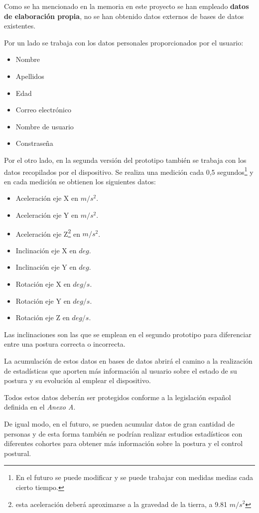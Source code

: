 
Como se ha mencionado en la memoria en este proyecto se han empleado \textbf{datos de elaboración propia}, no se han obtenido datos externos de bases de datos existentes. 

Por un lado se trabaja con los datos personales proporcionados por el usuario:
\begin{itemize}
    \item Nombre
    \item Apellidos
    \item Edad
    \item Correo electrónico
    \item Nombre de usuario
    \item Constraseña
\end{itemize}

Por el otro lado, en la segunda versión del prototipo también se trabaja con los datos recopilados por el dispositivo. Se realiza una medición cada 0,5 segundos\footnote{En el futuro se puede modificar y se puede trabajar con medidas medias cada cierto tiempo.} y en cada medición se obtienen los siguientes datos:
\begin{itemize}
    \item Aceleración eje X en $m/s^{2}$.
    \item Aceleración eje Y en $m/s^{2}$.
    \item Aceleración eje Z\footnote{esta aceleración deberá aproximarse a la gravedad de la tierra, a 9.81 $m/s^{2}$} en $m/s^{2}$.
    \item Inclinación eje X en $deg$.
    \item Inclinación eje Y en $deg$.
    \item Rotación eje X en $deg/s$.
    \item Rotación eje Y en $deg/s$.
    \item Rotación eje Z en $deg/s$.
\end{itemize}

Las inclinaciones son las que se emplean en el segundo prototipo para diferenciar entre una postura correcta o incorrecta.

La acumulación de estos datos en bases de datos abrirá el camino a la realización de estadísticas que aporten más información al usuario sobre el estado de su postura y su evolución al emplear el dispositivo.

Todos estos datos deberán ser protegidos conforme a la legislación español definida en el \textit{Anexo A}.

De igual modo, en el futuro, se pueden acumular datos de gran cantidad de personas y de esta forma también se podrían realizar estudios estadísticos con diferentes cohortes para obtener más información sobre la postura y el control postural.
